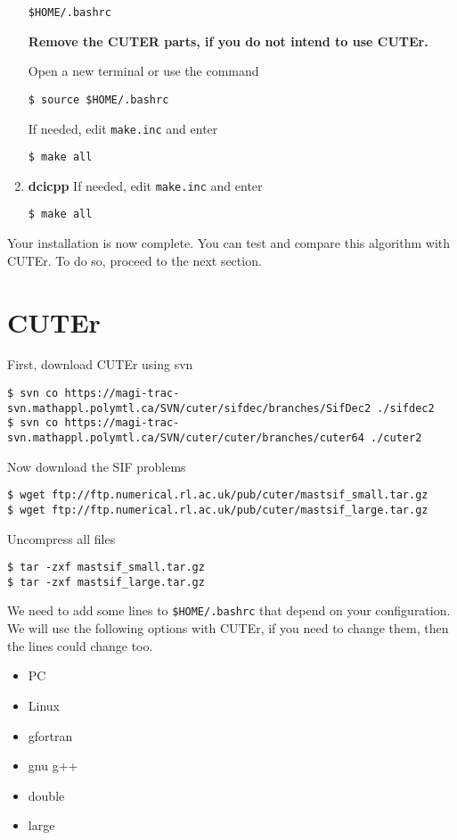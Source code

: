 \documentclass[letterpaper,11pt]{article}
\numberwithin{equation}{section}
\newcommand{\makesec}[1]{\section[#1]{#1}}
\begin{document}
\begin{enumerate}
\verb+$HOME/.bashrc+

{\bf Remove the CUTER parts, if you do not intend to use CUTEr. }

Open a new terminal or use the command
\begin{verbatim}
$ source $HOME/.bashrc
\end{verbatim}
If needed, edit \verb+make.inc+ and enter
\begin{verbatim}
$ make all
\end{verbatim}
   \item {\bf dcicpp} If needed, edit \verb+make.inc+ and enter
\begin{verbatim}
$ make all
\end{verbatim}
\end{enumerate}

Your installation is now complete. You can test and compare this algorithm with CUTEr. To do so, proceed to the next section.

\makesec{CUTEr}
First, download CUTEr using svn
\small
\begin{verbatim}
$ svn co https://magi-trac-svn.mathappl.polymtl.ca/SVN/cuter/sifdec/branches/SifDec2 ./sifdec2
$ svn co https://magi-trac-svn.mathappl.polymtl.ca/SVN/cuter/cuter/branches/cuter64 ./cuter2
\end{verbatim}
\normalsize
Now download the SIF problems
\begin{verbatim}
$ wget ftp://ftp.numerical.rl.ac.uk/pub/cuter/mastsif_small.tar.gz
$ wget ftp://ftp.numerical.rl.ac.uk/pub/cuter/mastsif_large.tar.gz
\end{verbatim}
Uncompress all files
\begin{verbatim}
$ tar -zxf mastsif_small.tar.gz
$ tar -zxf mastsif_large.tar.gz
\end{verbatim}
We need to add some lines to \verb+$HOME/.bashrc+ that depend on your configuration.
We will use the following options with CUTEr, if you need to change them, then the lines could change too. 
\begin{itemize}
\item PC
\item Linux
\item gfortran
\item gnu g++
\item double
\item large
\end{itemize}
\end{document}
